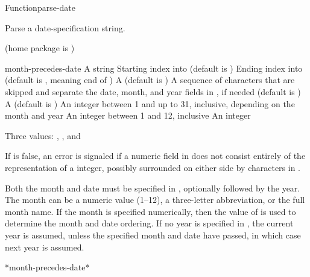 \documentclass[10pt,twoside,english,pdftex]{article}
\begin{document}
\begin{functiondoc}{Function}{parse-date}{%
     
    }
% 

\fnsyntax

\fnpurpose Parse a date-specification string.

\fnpackage {} (home package is )

\fnmodule {}

\fnargs
\begin{args}{month-precedes-date}
\arg[string] A string
\arg[start] Starting index into  (default is )
\arg[end] Ending index into  (default is \nil, meaning
end of )
 A  (default is \nil)
\arg[separators] A sequence of characters that are skipped and separate the
 date, month, and year fields in , if needed (default is 
 )
 A  (default is 
)
\arg[date] An integer between 1 and up to 31, inclusive, depending
  on the month and year
\arg[month] An integer between 1 and 12, inclusive
\arg[year] An integer
\end{args}

\fnreturns Three values: , , and 

\fnerrors
%
If  is false, an error is signaled if a numeric field in
 does not consist entirely of the representation of a integer,
possibly surrounded on either side by characters in .

\fndescription
%
Both the month and date must be specified in ,
optionally followed by the year. The month can be a numeric value (1--12), a
three-letter abbreviation, or the full month name.  If the month is specified
numerically, then the value of  is used to
determine the month and date ordering. If no year is specified in
, the current year is assumed, unless the specified month and date
have passed, in which case next year is assumed.

\begin{alsos}{*month-precedes-date*}
\end{alsos}


\end{functiondoc}
\end{document}
